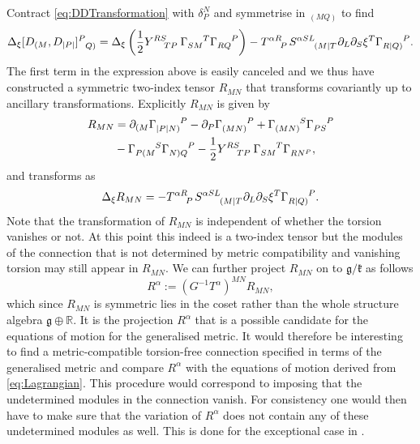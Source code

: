 Contract \eqref{eq:DDTransformation} with $\delta^N_P$ and symmetrise in $_{(MQ)}$ to find 
\begin{equation}
    \Delta_\xi [D_{(M},D_{|P|}]\tensor{}{^P_{Q)}} = \Delta_\xi \left(\frac{1}{2}\tensor{Y}{^{RS}_{TP}}\tensor{\Gamma}{_{SM}^T}\tensor{\Gamma}{_{RQ}^P}\right)-\tensor{T}{^{\alpha R}_P}\tensor{S}{^{\alpha SL}_{(M|T}}\pd_L\pd_S\xi^T\tensor{\Gamma}{_{R|Q)}^P}.
\end{equation}
The first term in the expression above is easily canceled and we thus have constructed a symmetric two-index tensor $R_{MN}$ that transforms covariantly up to ancillary transformations. Explicitly $R_{MN}$ is given by 
\begin{equation}
    \begin{aligned}
        R_{MN} &= \pd_{(M}\tensor{\Gamma}{_{|P|N)}^P}-\pd_P\tensor{\Gamma}{_{(MN)}^P}+\tensor{\Gamma}{_{(MN)}^S}\tensor{\Gamma}{_{PS}^P}\\
        &-\tensor{\Gamma}{_{P(M}^S}\tensor{\Gamma}{_{N)Q}^P}-\frac{1}{2}\tensor{Y}{^{RS}_{TP}}\tensor{\Gamma}{_{SM}^T}\tensor{\Gamma}{_{RN^P}},
    \end{aligned}
\end{equation}
and transforms as 
\begin{equation}
    \Delta_\xi R_{MN} = -\tensor{T}{^{\alpha R}_P}\tensor{S}{^{\alpha SL}_{(M|T}}\pd_L\pd_S\xi^T\tensor{\Gamma}{_{R|Q)}^P}.
\end{equation}
Note that the transformation of $R_{MN}$ is independent of whether the torsion vanishes or not. At this point this indeed is a two-index tensor but the modules of the connection that is not determined by metric compatibility and vanishing torsion may still appear in $R_{MN}$. We can further project $R_{MN}$ on to $\mathfrak{g}/\mathfrak{k}$ as follows 
\begin{equation}
    R^\alpha := (G^{-1}T^\alpha)^{MN}R_{MN},
\end{equation}
which since $R_{MN}$ is symmetric lies in the coset rather than the whole structure algebra $\mathfrak{g}\oplus\mathbb{R}$. It is the projection $R^\alpha$ that is a possible candidate for the equations of motion for the generalised metric. It would therefore be interesting to find a metric-compatible torsion-free connection specified in terms of the generalised metric and compare $R^\alpha$ with the equations of motion derived from \eqref{eq:Lagrangian}. This procedure would correspond to imposing that the undetermined modules in the connection vanish. For consistency one would then have to make sure that the variation of $R^\alpha$ does not contain any of these undetermined modules as well. This is done for the exceptional case in \cite{Cederwall:2013naa}.

